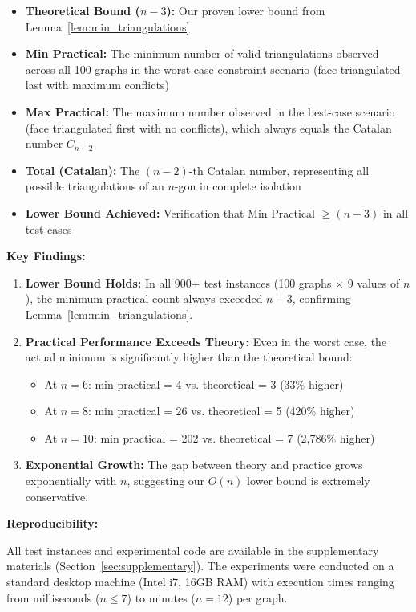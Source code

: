 \documentclass[12pt,a4paper]{article}
\theoremstyle{definition}
\theoremstyle{remark}
\begin{document}
\begin{itemize}
    \item \textbf{Theoretical Bound ($n-3$):} Our proven lower bound from Lemma~\ref{lem:min_triangulations}
    \item \textbf{Min Practical:} The minimum number of valid triangulations observed across all 100 graphs in the worst-case constraint scenario (face triangulated last with maximum conflicts)
    \item \textbf{Max Practical:} The maximum number observed in the best-case scenario (face triangulated first with no conflicts), which always equals the Catalan number $C_{n-2}$
    \item \textbf{Total (Catalan):} The $(n-2)$-th Catalan number, representing all possible triangulations of an $n$-gon in complete isolation
    \item \textbf{Lower Bound Achieved:} Verification that Min Practical $\geq (n-3)$ in all test cases
\end{itemize}

\textbf{Key Findings:}

\begin{enumerate}
    \item \textbf{Lower Bound Holds:} In all 900+ test instances (100 graphs $\times$ 9 values of $n$), the minimum practical count always exceeded $n-3$, confirming Lemma~\ref{lem:min_triangulations}.
    
    \item \textbf{Practical Performance Exceeds Theory:} Even in the worst case, the actual minimum is significantly higher than the theoretical bound:
    \begin{itemize}
        \item At $n=6$: min practical = 4 vs. theoretical = 3 (33\% higher)
        \item At $n=8$: min practical = 26 vs. theoretical = 5 (420\% higher)
        \item At $n=10$: min practical = 202 vs. theoretical = 7 (2,786\% higher)
    \end{itemize}
    
    \item \textbf{Exponential Growth:} The gap between theory and practice grows exponentially with $n$, suggesting our $O(n)$ lower bound is extremely conservative.
\end{enumerate}

\textbf{Reproducibility:}

All test instances and experimental code are available in the supplementary materials (Section~\ref{sec:supplementary}). The experiments were conducted on a standard desktop machine (Intel i7, 16GB RAM) with execution times ranging from milliseconds ($n \leq 7$) to minutes ($n=12$) per graph.
\end{document}
